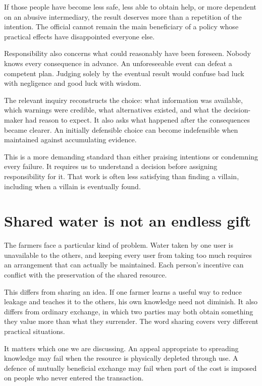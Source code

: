 \documentclass[12pt,a4paper]{book}
\begin{document}
If those people have become less safe, less able to obtain help, or more dependent on an abusive intermediary, the result deserves more than a repetition of the intention. The official cannot remain the main beneficiary of a policy whose practical effects have disappointed everyone else.

Responsibility also concerns what could reasonably have been foreseen. Nobody knows every consequence in advance. An unforeseeable event can defeat a competent plan. Judging solely by the eventual result would confuse bad luck with negligence and good luck with wisdom.

The relevant inquiry reconstructs the choice: what information was available, which warnings were credible, what alternatives existed, and what the decision-maker had reason to expect. It also asks what happened after the consequences became clearer. An initially defensible choice can become indefensible when maintained against accumulating evidence.

This is a more demanding standard than either praising intentions or condemning every failure. It requires us to understand a decision before assigning responsibility for it. That work is often less satisfying than finding a villain, including when a villain is eventually found.

\section*{Shared water is not an endless gift}

The farmers face a particular kind of problem. Water taken by one user is unavailable to the others, and keeping every user from taking too much requires an arrangement that can actually be maintained. Each person's incentive can conflict with the preservation of the shared resource.

This differs from sharing an idea. If one farmer learns a useful way to reduce leakage and teaches it to the others, his own knowledge need not diminish. It also differs from ordinary exchange, in which two parties may both obtain something they value more than what they surrender. The word sharing covers very different practical situations.

It matters which one we are discussing. An appeal appropriate to spreading knowledge may fail when the resource is physically depleted through use. A defence of mutually beneficial exchange may fail when part of the cost is imposed on people who never entered the transaction.
\end{document}
